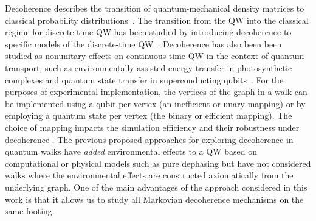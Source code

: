 \documentclass[11pt,oneside,final]{huthesis}%
\begin{document}
Decoherence describes the transition of quantum-mechanical density matrices to classical probability distributions~\cite{Sudarshan61,Kossakowski72,Lindblad76,
  Gorini76,Rodriguez08}. 
The transition from the QW into the classical regime for discrete-time QW has been studied
by introducing decoherence to specific models of the discrete-time QW~\cite{Brun03,Kendon07,Romanelli05, Love05}.  
Decoherence has also been been
studied as nonunitary effects on continuous-time QW in the context of
quantum transport, such as environmentally assisted energy transfer in
photosynthetic complexes \cite{Rebentrost08,Mohseni08, Plenio08,Caruso09,Rebentrost09}
and quantum state transfer in superconducting qubits~\cite{Strauch08,Strauch09}. For the purposes of experimental
implementation, the vertices of the graph in a walk can be implemented
using a qubit per vertex (an inefficient or unary mapping) or by
employing a quantum state per vertex (the binary or
efficient mapping). The choice of mapping impacts the simulation
efficiency and their robustness under decoherence \cite{Hines07,
  Drezgic08,Strauch09b}. The previous proposed approaches for
exploring decoherence in quantum walks have {\sl added}
environmental effects to a QW based on computational or physical
models such as pure dephasing \cite{Rebentrost09} but have not
considered walks where the environmental effects are constructed
axiomatically from the underlying graph.  One of the main advantages
of the approach considered in this work is that it allows us to study all Markovian 
decoherence mechanisms on the same footing. 
\end{document}
